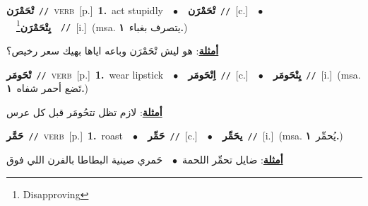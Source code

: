 \documentclass[10pt,a4paper,twoside]{article} %
\begin{document}
\begin{multicols}{2}
{\setlength\topsep{0pt}\textbf{\foreignlanguage{arabic}{تْحَمْرَن}}\ {\color{gray}\texttt{//}\color{black}}\ \textsc{verb}\ [p.]\ \textbf{1.}~act stupidly\ \ $\bullet$\ \ \setlength\topsep{0pt}\textbf{\foreignlanguage{arabic}{تْحَمْرَن}}\ {\color{gray}\texttt{//}\color{black}}\ [c.]\ \ $\bullet$\ \ \setlength\topsep{0pt}\textbf{\foreignlanguage{arabic}{يِتْحَمْرَن}}\footnote{Disapproving}\ \ {\color{gray}\texttt{//}\color{black}}\ [i.]\ \color{gray}(msa. \foreignlanguage{arabic}{يتصرف بغباء}~\foreignlanguage{arabic}{\textbf{١.}})\color{black}\  \begin{flushright}\color{gray}\foreignlanguage{arabic}{\textbf{\underline{\foreignlanguage{arabic}{أمثلة}}}: هو ليش تْحَمْرَن وباعه اياها بهيك سعر رخيص؟}\end{flushright}\color{black}} \vspace{2mm}

{\setlength\topsep{0pt}\textbf{\foreignlanguage{arabic}{تْحَومَر}}\ {\color{gray}\texttt{//}\color{black}}\ \textsc{verb}\ [p.]\ \textbf{1.}~wear lipstick\ \ $\bullet$\ \ \setlength\topsep{0pt}\textbf{\foreignlanguage{arabic}{اِتْحَومَر}}\ {\color{gray}\texttt{//}\color{black}}\ [c.]\ \ $\bullet$\ \ \setlength\topsep{0pt}\textbf{\foreignlanguage{arabic}{يِتْحَومَر}}\ {\color{gray}\texttt{//}\color{black}}\ [i.]\ \color{gray}(msa. \foreignlanguage{arabic}{تَضع أحمر شفاه}~\foreignlanguage{arabic}{\textbf{١.}})\color{black}\  \begin{flushright}\color{gray}\foreignlanguage{arabic}{\textbf{\underline{\foreignlanguage{arabic}{أمثلة}}}: لازم تظل تتحُومَر قبل كل عرس}\end{flushright}\color{black}} \vspace{2mm}

{\setlength\topsep{0pt}\textbf{\foreignlanguage{arabic}{حَمَّر}}\ {\color{gray}\texttt{//}\color{black}}\ \textsc{verb}\ [p.]\ \textbf{1.}~roast\ \ $\bullet$\ \ \setlength\topsep{0pt}\textbf{\foreignlanguage{arabic}{حَمِّر}}\ {\color{gray}\texttt{//}\color{black}}\ [c.]\ \ $\bullet$\ \ \setlength\topsep{0pt}\textbf{\foreignlanguage{arabic}{يحَمِّر}}\ {\color{gray}\texttt{//}\color{black}}\ [i.]\ \color{gray}(msa. \foreignlanguage{arabic}{يُحمِّر}~\foreignlanguage{arabic}{\textbf{١.}})\color{black}\  \begin{flushright}\color{gray}\foreignlanguage{arabic}{\textbf{\underline{\foreignlanguage{arabic}{أمثلة}}}: ضايل تحمِّر اللحمة\ $\bullet$\ \  حَمري صينية البطاطا بالفرن اللي فوق}\end{flushright}\color{black}} \vspace{2mm}


\end{multicols}
\end{document}
